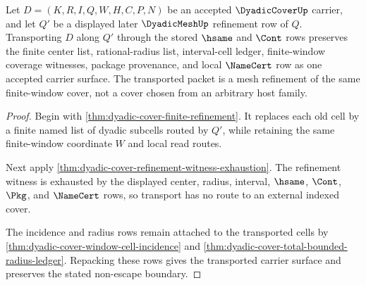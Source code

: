 \begin{theorem}
\label{thm:dyadic-cover-mesh-refinement-carrier-transport}
Let $D=(K,R,I,Q,W,H,C,P,N)$ be an accepted $\DyadicCoverUp$ carrier, and let
$Q'$ be a displayed later $\DyadicMeshUp$ refinement row of $Q$. Transporting
$D$ along $Q'$ through the stored $\hsame$ and $\Cont$ rows preserves the finite
center list, rational-radius list, interval-cell ledger, finite-window
coverage witnesses, package provenance, and local $\NameCert$ row as one
accepted carrier surface. The transported packet is a mesh refinement of the
same finite-window cover, not a cover chosen from an arbitrary host family.
\end{theorem}
\begin{proof}
Begin with \autoref{thm:dyadic-cover-finite-refinement}. It replaces each old
cell by a finite named list of dyadic subcells routed by $Q'$, while retaining
the same finite-window coordinate $W$ and local read routes.

Next apply \autoref{thm:dyadic-cover-refinement-witness-exhaustion}. The
refinement witness is exhausted by the displayed center, radius, interval,
$\hsame$, $\Cont$, $\Pkg$, and $\NameCert$ rows, so transport has no route to an
external indexed cover.

The incidence and radius rows remain attached to the transported cells by
\autoref{thm:dyadic-cover-window-cell-incidence} and
\autoref{thm:dyadic-cover-total-bounded-radius-ledger}. Repacking these rows
gives the transported carrier surface and preserves the stated non-escape
boundary.
\end{proof}

